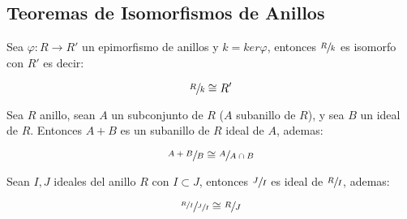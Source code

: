 
    \subsection{Teoremas de Isomorfismos de Anillos}

        \begin{teorema}
            Sea $\varphi: R \to R'$ un epimorfismo de anillos y $k = ker{\varphi}$, entonces $\sfrac{R}{k}$ es isomorfo con $R'$ es decir:

            \begin{equation}
                \sfrac{R}{k} \cong R'
            \end{equation}
        \end{teorema}

        \begin{teorema}
            Sea $R$ anillo, sean $A$ un subconjunto de $R$ ($A$ subanillo de $R$), y sea $B$ un ideal de $R$. Entonces $A+B$ es un subanillo de $R$ ideal de $A$, ademas:

            \begin{equation}
                \sfrac{A+B}{B} \cong \sfrac{A}{A \cap B}
            \end{equation}
        \end{teorema}

        \begin{teorema}
            Sean $I, J$ ideales del anillo $R$ con $I \subset J$, entonces $\sfrac{J}{I}$ es ideal de $\sfrac{R}{I}$, ademas:

            \begin{equation}
                \sfrac{\sfrac{R}{I}}{\sfrac{J}{I}} \cong \sfrac{R}{J}
            \end{equation}
        \end{teorema}

